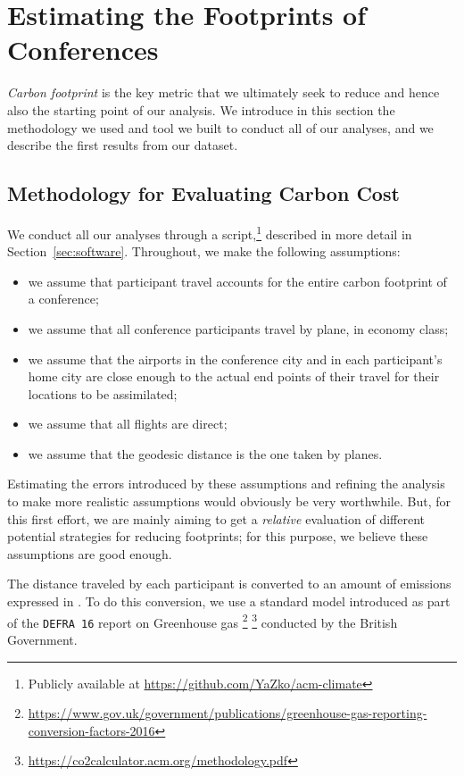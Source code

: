 \section{Estimating the Footprints of Conferences}
\label{sec:footprint}

{\em Carbon footprint} is the key metric that we ultimately seek to reduce
and hence also the starting point of our analysis.  We introduce in this
section the methodology we used and tool we built to conduct all of our
analyses, and we describe the first results from our dataset.

\subsection{Methodology for Evaluating Carbon Cost}
\label{sec:methodo}

We conduct all our analyses through a \python{} script,\footnote{Publicly available at
\url{https://github.com/YaZko/acm-climate}} described in more detail in Section~\ref{sec:software}.
%
Throughout, we make the following assumptions:
\begin{itemize}
\item we assume that participant travel accounts for the entire carbon
footprint of a conference;
\item we assume that {all} conference participants travel by plane, in economy
class;
\item we assume that the airports in the conference city and in each
participant's home city are close enough to the actual end points of their
travel for their locations to be assimilated;
\item we assume that all flights are direct;
\item we assume that the geodesic distance is the one taken by planes.
\end{itemize}
Estimating the errors introduced by these assumptions and refining the
analysis to make more realistic assumptions would obviously be very
worthwhile.
%
But, for this first effort, we are mainly aiming to get a
{\em relative} evaluation of different potential strategies for reducing
footprints; for this purpose, we believe these assumptions are good enough.

The distance traveled by each participant is converted to an amount of
emissions expressed in \gaz. To do this conversion, we use a standard model
introduced as part of the \texttt{DEFRA 16} report on Greenhouse gas
\footnote{\url{https://www.gov.uk/government/publications/greenhouse-gas-reporting-conversion-factors-2016}}
\footnote{\url{https://co2calculator.acm.org/methodology.pdf}} conducted by
the British Government.

